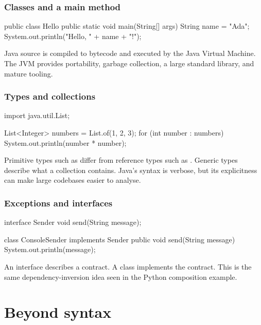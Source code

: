 \documentclass[11pt,openany,oneside]{book}
\newcommand{\inlinecode}[1]{\texttt{\small\detokenize{#1}}}
\begin{document}
\section{Classes and a main method}

\begin{code}[language=Java]
public class Hello {
    public static void main(String[] args) {
        String name = "Ada";
        System.out.println("Hello, " + name + "!");
    }
}
\end{code}

Java source is compiled to bytecode and executed by the Java Virtual Machine. The JVM provides portability, garbage collection, a large standard library, and mature tooling.

\section{Types and collections}

\begin{code}[language=Java]
import java.util.List;

List<Integer> numbers = List.of(1, 2, 3);
for (int number : numbers) {
    System.out.println(number * number);
}
\end{code}

Primitive types such as \inlinecode{int} differ from reference types such as \inlinecode{String}. Generic types describe what a collection contains. Java's syntax is verbose, but its explicitness can make large codebases easier to analyse.

\section{Exceptions and interfaces}

\begin{code}[language=Java]
interface Sender {
    void send(String message);
}

class ConsoleSender implements Sender {
    public void send(String message) {
        System.out.println(message);
    }
}
\end{code}

An interface describes a contract. A class implements the contract. This is the same dependency-inversion idea seen in the Python composition example.

\part{Beyond syntax}
\end{document}
